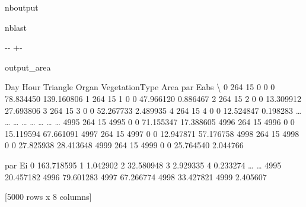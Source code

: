 \documentclass[letterpaper,10pt,english]{sphinxmanual}
\begin{document}
\begin{sphinxuseclass}{nboutput}
\begin{sphinxuseclass}{nblast}
{

\kern-\sphinxverbatimsmallskipamount\kern-\baselineskip
\kern+\FrameHeightAdjust\kern-\fboxrule
\vspace{\nbsphinxcodecellspacing}

\begin{sphinxuseclass}{output_area}
\begin{sphinxuseclass}{}


\begin{sphinxVerbatim}[commandchars=\\\{\}]
      Day  Hour  Triangle  Organ  VegetationType       Area    par Eabs  \textbackslash{}
0     264    15         0      0               0  78.834450  139.160806
1     264    15         1      0               0  47.966120    0.886467
2     264    15         2      0               0  13.309912   27.693806
3     264    15         3      0               0  52.267733    2.489935
4     264    15         4      0               0  12.524847    0.198283
{\ldots}   {\ldots}   {\ldots}       {\ldots}    {\ldots}             {\ldots}        {\ldots}         {\ldots}
4995  264    15      4995      0               0  71.155347   17.388605
4996  264    15      4996      0               0  15.119594   67.661091
4997  264    15      4997      0               0  12.947871   57.176758
4998  264    15      4998      0               0  27.825938   28.413648
4999  264    15      4999      0               0  25.764540    2.044766

          par Ei
0     163.718595
1       1.042902
2      32.580948
3       2.929335
4       0.233274
{\ldots}          {\ldots}
4995   20.457182
4996   79.601283
4997   67.266774
4998   33.427821
4999    2.405607

[5000 rows x 8 columns]
\end{sphinxVerbatim}



\end{sphinxuseclass}
\end{sphinxuseclass}
}

\end{sphinxuseclass}
\end{sphinxuseclass}
\end{document}
